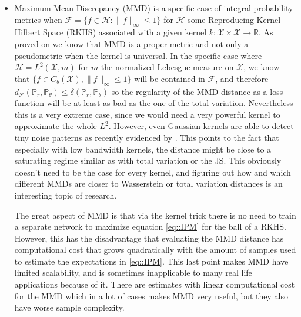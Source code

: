 \documentclass{article} %
\newcommand\PP{\mathbb{P}}
\newcommand\RR{\mathbb{R}}
\theoremstyle{definition}
\theoremstyle{definition}
\newcommand\manX{\mathcal{X}}
\newcommand\manF{\mathcal{F}}
\begin{document}
\begin{itemize}
\item Maximum Mean Discrepancy (MMD) \cite{Gretton-ea-MMD} is
a specific case of integral probability metrics when
$\manF = \{f \in \mathcal{H}: \|f\|_\infty \leq 1\}$ for
$\mathcal{H}$ some Reproducing Kernel Hilbert Space (RKHS)
associated with a given kernel $k: \manX \times \manX \rightarrow \RR$.
As proved on \cite{Gretton-ea-MMD} we know that MMD is a proper
metric and not only a pseudometric when the kernel is universal.
In the specific case where
$\mathcal{H} = L^2(\manX, m)$ for $m$ the normalized Lebesgue
measure on $\manX$, we know that $\{f \in C_b(\manX), \|f\|_\infty \leq 1\}$
will be contained in $\manF$, and therefore $d_\manF(\PP_r, \PP_\theta)
\leq \delta(\PP_r, \PP_\theta)$ so the regularity of the MMD distance
as a loss function will be at least as bad as the one of the total
variation. Nevertheless this is a very extreme case, since we would
need a very powerful kernel to approximate the whole $L^2$. However,
even Gaussian kernels are able to detect tiny noise patterns
as recently evidenced by \cite{South-ea-MMD}. This points to the
fact that especially with low bandwidth kernels, the distance
might be close to a saturating regime similar as with total
variation or the JS. This obviously doesn't need to
be the case for every kernel, and figuring out how and which different MMDs
are closer to Wasserstein or total variation distances is an interesting
topic of research.

The great aspect of MMD is that via the kernel trick there is no need
to train a separate network to maximize equation \eqref{eq::IPM} for the ball
of a RKHS. However, this has the disadvantage that evaluating the MMD distance
has computational cost that grows quadratically with the amount of samples
used to estimate the expectations in \eqref{eq::IPM}. This last point
makes MMD have limited scalability, and is sometimes inapplicable to
many real life applications because of it. There are estimates with
linear computational cost for the MMD \cite{Gretton-ea-MMD} which
in a lot of cases makes MMD very useful, but they also have worse sample complexity.


\end{itemize}
\end{document}
